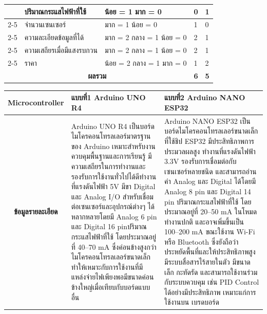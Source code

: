 \documentclass[14pt, fleqn, a4paper]{extarticle}
\begin{document}
\begin{enumerate}
\begin{enumerate}
\begin{table}[H]
\begin{tabular}{|p{1cm}|p{2cm}|p{1.75cm}|p{5cm}|p{5cm}|}
			\multirow{5}{*}{\rotatebox{90}{\parbox{3cm}{\centering\textbf{เกณฑ์การพิจารณา}}}}
			& ปริมาณกระแสไฟฟ้าที่ใช้ & น้อย = 1 มาก = 0
			& 0 & 1 \\ \cline{2-5}

			& จำนวนเซนเซอร์ & มาก = 1 น้อย = 0
			& 1 & 0 \\ \cline{2-5}

			& ความละเอียดข้อมูลที่ได้ & มาก = 2 กลาง = 1 น้อย = 0
			& 2 & 1 \\ \cline{2-5}

			& ความเสถียรเมื่อมีแสงรบกวน & มาก = 2 กลาง = 1 น้อย = 0
			& 2 & 1 \\ \cline{2-5}

			& ราคา & น้อย  = 2 กลาง = 1 มาก = 0
			& 1 & 2 \\ \hline

			\multicolumn{3}{|c|}{\textbf{ผลรวม}} & \textbf{6} & \textbf{5} \\ \hline

			\end{tabular}
			\end{table}
			\begin{table}[H]
			\centering
			\renewcommand{\arraystretch}{1.35}

			\begin{tabular}{|p{1cm}|p{2cm}|p{1.75cm}|p{5cm}|p{5cm}|}
			\hline

			\multicolumn{3}{|c|}{\textbf{Microcontroller}} 
			& \textbf{แบบที่1 Arduino UNO R4} 
			& \textbf{แบบที่2 Arduino NANO ESP32} 
			\\ \hline

			\multicolumn{3}{|c|}{\textbf{ข้อมูลรายละเอียด}} 
			& \multicolumn{1}{p{5cm}|}{
			Arduino UNO R4 เป็นบอร์ดไมโครคอนโทรลเลอร์มาตรฐานของ Arduino เหมาะสำหรับงานควบคุมพื้นฐานและการเรียนรู้ มีความเสถียรในการทำงานและรองรับการใช้งานทั่วไปได้ดีทำงานที่แรงดันไฟฟ้า 5V มีขา Digital และ Analog I/O สำหรับเชื่อมต่อเซนเซอร์และอุปกรณ์ต่างๆ ได้หลากหลายโดยมี Analog 6 pin และ Digital 16 pinปริมาณกระแสไฟฟ้าที่ใช้ โดยประมาณอยู่ที่ 40–70 mA ซึ่งค่อนข้างสูงกว่าไมโครคอนโทรลเลอร์ขนาดเล็ก ทำให้เหมาะกับการใช้งานที่มีแหล่งจ่ายไฟเพียงพอมีขนาดค่อนข้างใหญ่เมื่อเทียบกับบอร์ดแบบอื่น
			} 
			& \multicolumn{1}{p{5cm}|}{
			Arduino NANO ESP32
เป็นบอร์ดไมโครคอนโทรลเลอร์ขนาดเล็กที่ใช้ชิป ESP32
มีประสิทธิภาพการประมวลผลสูง 
ทำงานที่แรงดันไฟฟ้า 3.3V รองรับการเชื่อมต่อกับเซนเซอร์หลายชนิด และสามารถอ่านค่า Analog และ Digital ได้โดยมี Analog 8 pin และ Digital 14 pin
ปริมาณกระแสไฟฟ้าที่ใช้ โดยประมาณอยู่ที่ 20–50 mA ในโหมดทำงานปกติ และอาจเพิ่มขึ้นเป็น 100–200 mA ขณะใช้งาน 
Wi-Fi หรือ Bluetooth ซึ่งยังถือว่าประหยัดพื้นที่และให้ประสิทธิภาพสูง
มีระบบสื่อสารไร้สายในตัว มีขนาดเล็ก กะทัดรัด  และสามารถใช้งานร่วมกับระบบควบคุม 
เช่น PID Control ได้อย่างมีประสิทธิภาพ
เหมาะแก่การใช้งานบน
เบรดบอร์ด


}
\end{tabular}
\end{table}
\end{enumerate}
\end{enumerate}
\end{document}
